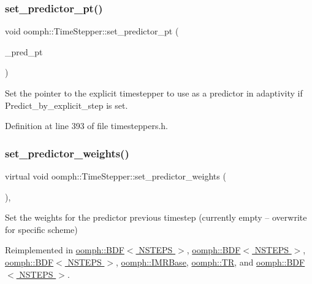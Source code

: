 \subsubsection{\texorpdfstring{set\+\_\+predictor\+\_\+pt()}{set\_predictor\_pt()}}
{\footnotesize\ttfamily void oomph\+::\+Time\+Stepper\+::set\+\_\+predictor\+\_\+pt (\begin{DoxyParamCaption}\item[{\hyperlink{classoomph_1_1ExplicitTimeStepper}{Explicit\+Time\+Stepper} $\ast$}]{\+\_\+pred\+\_\+pt }\end{DoxyParamCaption})\hspace{0.3cm}{\ttfamily [inline]}}

Set the pointer to the explicit timestepper to use as a predictor in adaptivity if Predict\+\_\+by\+\_\+explicit\+\_\+step is set. 

Definition at line 393 of file timesteppers.\+h.

\mbox{\label{classoomph_1_1TimeStepper_a2dfb949155ba433066fd69dc427ba1ce}} 
\subsubsection{\texorpdfstring{set\+\_\+predictor\+\_\+weights()}{set\_predictor\_weights()}}
{\footnotesize\ttfamily virtual void oomph\+::\+Time\+Stepper\+::set\+\_\+predictor\+\_\+weights (\begin{DoxyParamCaption}{ }\end{DoxyParamCaption})\hspace{0.3cm}{\ttfamily [inline]}, {\ttfamily [virtual]}}



Set the weights for the predictor previous timestep (currently empty -- overwrite for specific scheme) 



Reimplemented in \hyperlink{classoomph_1_1BDF_a9c5b309e589b0e0da14d912556e5cc4a}{oomph\+::\+B\+D\+F$<$ N\+S\+T\+E\+P\+S $>$}, \hyperlink{classoomph_1_1BDF_a7a436823d855b4148a2a9f5a63ed8f3d}{oomph\+::\+B\+D\+F$<$ N\+S\+T\+E\+P\+S $>$}, \hyperlink{classoomph_1_1BDF_a77a34b38a52120ed7eb9fec88bfdc3ca}{oomph\+::\+B\+D\+F$<$ N\+S\+T\+E\+P\+S $>$}, \hyperlink{classoomph_1_1IMRBase_a68771c915a13f5a3e3655fff12cb73a3}{oomph\+::\+I\+M\+R\+Base}, \hyperlink{classoomph_1_1TR_aef78c8db06cbf63829040190dfda04da}{oomph\+::\+TR}, and \hyperlink{classoomph_1_1BDF_ac568d7f427667cf6a80b772aa3431980}{oomph\+::\+B\+D\+F$<$ N\+S\+T\+E\+P\+S $>$}.



